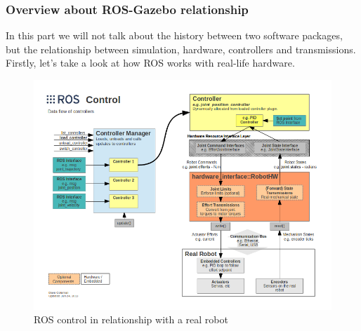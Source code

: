\documentclass[pdftex,12pt,a4paper]{article}
\begin{document}
  \subsubsection{Overview about ROS-Gazebo relationship}
  In this part we will not talk about the history between two software packages, but the relationship between simulation, hardware, controllers and transmissions. Firstly, let's take a look at how ROS works with real-life hardware.
  \begin{figure}[h]
      \centering
      \includegraphics[width=0.9\linewidth]{image/gazebo_ros_control.png}
      \caption{ROS control in relationship with a real robot}
      \label{fig:gazebo_ros_control}
  \end{figure}
  
\end{document}
